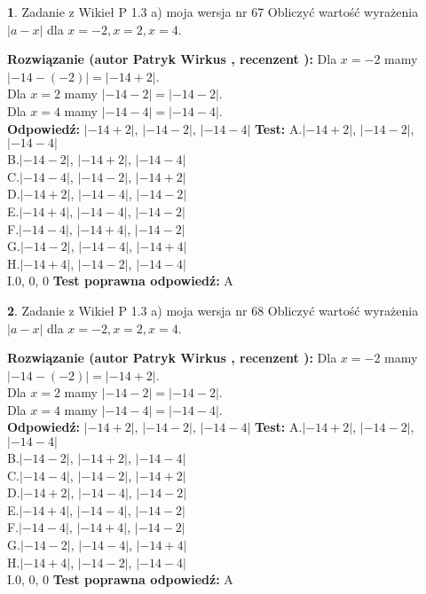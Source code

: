 \documentclass[12pt, a4paper]{article}
\theoremstyle{definition} %
\newtheorem{zad}{}
\newcommand{\zadStart}[1]{\begin{zad}#1\newline}
\newcommand{\zadStop}{\end{zad}}
\newcommand{\rozwStart}[2]{\noindent \textbf{Rozwiązanie (autor #1 , recenzent #2): }\newline}
\newcommand{\rozwStop}{\newline}
\newcommand{\odpStart}{\noindent \textbf{Odpowiedź:}\newline}
\newcommand{\odpStop}{\newline}
\newcommand{\testStart}{\noindent \textbf{Test:}\newline}
\newcommand{\testStop}{\newline}
\newcommand{\kluczStart}{\noindent \textbf{Test poprawna odpowiedź:}\newline}
\newcommand{\kluczStop}{\newline}
\begin{document}
\zadStart{Zadanie z Wikieł P 1.3 a) moja wersja nr 67}
Obliczyć wartość wyrażenia $|a - x|$ dla $x=-2,x=2,x=4$.
\zadStop
\rozwStart{Patryk Wirkus}{}
Dla $x = -2$ mamy $|-14 - (-2)| = |-14 + 2|$.\\
Dla $x = 2$ mamy $|-14 - 2| = |-14 - 2|$.\\
Dla $x = 4$ mamy $|-14 - 4| = |-14 - 4|$.\\
\rozwStop
\odpStart
$|-14 + 2|$, $|-14 - 2|$, $|-14 - 4|$
\odpStop
\testStart
A.$|-14 + 2|$, $|-14 - 2|$, $|-14 - 4|$\\
B.$|-14 - 2|$, $|-14 + 2|$, $|-14 - 4|$\\
C.$|-14 - 4|$, $|-14 - 2|$, $|-14 + 2|$\\
D.$|-14 + 2|$, $|-14 - 4|$, $|-14 - 2|$\\
E.$|-14 + 4|$, $|-14 - 4|$, $|-14 - 2|$\\
F.$|-14 - 4|$, $|-14 + 4|$, $|-14 - 2|$\\
G.$|-14 - 2|$, $|-14 - 4|$, $|-14 + 4|$\\
H.$|-14 + 4|$, $|-14 - 2|$, $|-14 - 4|$\\
I.$0$, $0$, $0$
\testStop
\kluczStart
A
\kluczStop



\zadStart{Zadanie z Wikieł P 1.3 a) moja wersja nr 68}
Obliczyć wartość wyrażenia $|a - x|$ dla $x=-2,x=2,x=4$.
\zadStop
\rozwStart{Patryk Wirkus}{}
Dla $x = -2$ mamy $|-14 - (-2)| = |-14 + 2|$.\\
Dla $x = 2$ mamy $|-14 - 2| = |-14 - 2|$.\\
Dla $x = 4$ mamy $|-14 - 4| = |-14 - 4|$.\\
\rozwStop
\odpStart
$|-14 + 2|$, $|-14 - 2|$, $|-14 - 4|$
\odpStop
\testStart
A.$|-14 + 2|$, $|-14 - 2|$, $|-14 - 4|$\\
B.$|-14 - 2|$, $|-14 + 2|$, $|-14 - 4|$\\
C.$|-14 - 4|$, $|-14 - 2|$, $|-14 + 2|$\\
D.$|-14 + 2|$, $|-14 - 4|$, $|-14 - 2|$\\
E.$|-14 + 4|$, $|-14 - 4|$, $|-14 - 2|$\\
F.$|-14 - 4|$, $|-14 + 4|$, $|-14 - 2|$\\
G.$|-14 - 2|$, $|-14 - 4|$, $|-14 + 4|$\\
H.$|-14 + 4|$, $|-14 - 2|$, $|-14 - 4|$\\
I.$0$, $0$, $0$
\testStop
\kluczStart
A
\kluczStop
\end{document}
